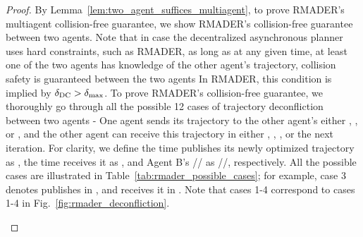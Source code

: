 \begin{proof}
By Lemma~\ref{lem:two_agent_suffices_multiagent}, to prove RMADER's multiagent collision-free guarantee, we show RMADER's collision-free guarantee between two agents.
Note that in case the decentralized asynchronous planner uses hard constraints, such as RMADER, as long as at any given time, at least one of the two agents has knowledge of the other agent's trajectory, collision safety is guaranteed between the two agents \textemdash In RMADER, this condition is implied by $\delta_\text{DC}{}>\delta_\text{max}{}$. 
To prove RMADER's collision-free guarantee, we thoroughly go through all the possible 12 cases of trajectory deconfliction between two agents - One agent sends its trajectory to the other agent's either \OStep{}, \CStep{}, or \DCStep{}, and the other agent can receive this trajectory in either \OStep{}, \CStep{}, \DCStep{}, or the next iteration. 
For clarity, we define the time \AgentA{} publishes its newly optimized trajectory as \tApub, the time \AgentB{} receives it as \tBrec, and Agent B's \OptimizationStep/\CheckStep/\DelayCheckStep{} as \OStepB/\CStepB/\DCStepB, respectively. All the possible cases are illustrated in Table~\ref{tab:rmader_possible_cases}; for example, case 3 denotes \AgentA{} publishes in \OStepB{}, and \AgentB{} receives it in \DCStepB{}. Note that cases 1-4 correspond to cases 1-4 in Fig.~\ref{fig:rmader_deconfliction}.

\begin{table}[h]
\caption{\centering RMADER Trajectory Deconfliction Cases}
\label{tab:rmader_possible_cases}
\begin{centering}
\renewcommand{\arraystretch}{1.0}
\par\end{centering}
\end{table}


\end{proof}
